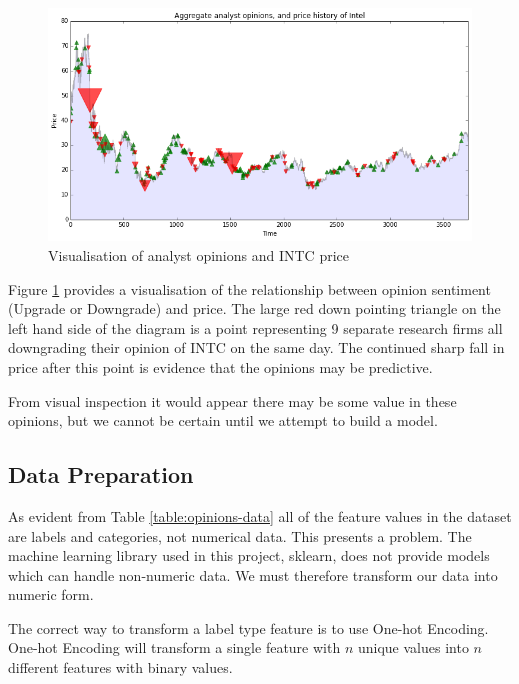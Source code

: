 \documentclass{report}
\begin{document}
\begin{figure}[H]
	\caption{Visualisation of analyst opinions and INTC price}
	\centerline{\includegraphics[scale=0.5]{vis/analyst_opinions.png}}
	\label{fig:opinions_vis}
\end{figure} 

Figure \ref{fig:opinions_vis} provides a visualisation of the relationship between opinion sentiment (Upgrade or Downgrade) and price. The large red down pointing triangle on the left hand side of the diagram is a point representing 9 separate research firms all downgrading their opinion of INTC on the same day. The continued sharp fall in price after this point is evidence that the opinions may be predictive.

From visual inspection it would appear there may be some value in these opinions, but we cannot be certain until we attempt to build a model.

\subsection{Data Preparation}

As evident from Table \ref{table:opinions-data} all of the feature values in the dataset are labels and categories, not numerical data. This presents a problem. The machine learning library used in this project, sklearn, does not provide models which can handle non-numeric data. We must therefore transform our data into numeric form.

The correct way to transform a label type feature is to use One-hot Encoding. One-hot Encoding will transform a single feature with $n$ unique values into $n$ different features with binary values.
\end{document}

